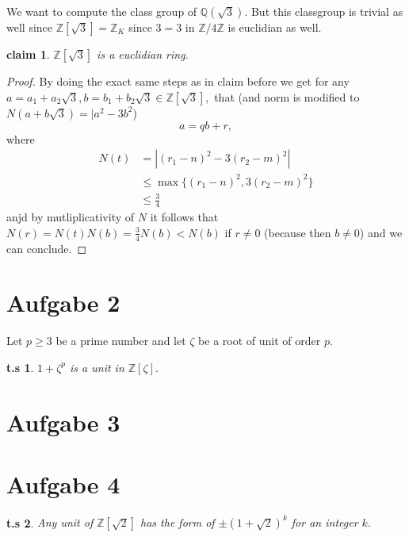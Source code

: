 \documentclass[10pt,a4paper]{article}
\newtheorem*{zz*}{t.s}
\newtheorem*{claim*}{claim}
\newcommand{\QQ}{\mathbb{Q}}
\newcommand{\ZZ}{\mathbb{Z}}
\begin{document}
We want to compute the class group of $\QQ(\sqrt{3}).$ But this classgroup is trivial as well since $\ZZ[\sqrt{3}] = \ZZ_K$ since $3 = 3$ in $\ZZ/4\ZZ$ is euclidian as well.

\begin{claim*}
	$\ZZ[\sqrt{3}]$ is a euclidian ring. 
\end{claim*}
\begin{proof}
	By doing the exact same steps as in claim before we get for any  $a = a_1 + a_2\sqrt{3}, b = b_1+b_2\sqrt{3}\in \ZZ[\sqrt{3}],$ that (and norm is modified to $N(a+b\sqrt{3}) = |a^2-3b^2$)
	\[a = qb + r,\]
	where 
		\begin{align*}
		N(t) &= |(r_1 - n)^2 - 3(r_2 - m)^2|\\
		&\leq \max\{(r_1 - n)^2, 3(r_2 - m)^2\}\\
		&\leq \frac{3}{4}
	\end{align*}
anjd by mutliplicativity of $N$ it follows that $N(r) = N(t)N(b) = \frac{3}{4}N(b) < N(b)$ if $r\neq 0$ (because then $b\neq 0$) and we can conclude.
\end{proof}
	
\pagebreak
\section*{Aufgabe 2}
	Let $p\geq 3$ be a prime number and let $\zeta$ be a root of unit of order $p.$
	\begin{zz*}
		$1+\zeta^p$ is a unit in $\ZZ[\zeta].$
	\end{zz*}
\pagebreak

\section*{Aufgabe 3}

	
\pagebreak

\section*{Aufgabe 4}
\begin{zz*}
	Any unit of $\ZZ[\sqrt{2}]$ has the form of $\pm(1+\sqrt{2})^{k}$ for an integer $k.$
\end{zz*}

	
\end{document}
